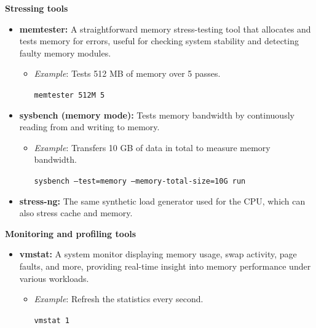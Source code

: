 \begin{exampleblock}

\textbf{Stressing tools}

\begin{itemize}
    \item \textbf{memtester:} A straightforward memory stress-testing tool that allocates and tests memory for errors, useful for checking system stability and detecting faulty memory modules.
    \begin{itemize}
        \item \textit{Example}: Tests 512 MB of memory over 5 passes.

        \begin{center}
        \tt{memtester 512M 5}
        \end{center}
    \end{itemize}

    \item \textbf{sysbench (memory mode):} Tests memory bandwidth by continuously reading from and writing to memory.
    \begin{itemize}
        \item \textit{Example}: Transfers 10 GB of data in total to measure memory bandwidth.

        \begin{center}
        \tt{sysbench --test=memory --memory-total-size=10G run}
        \end{center}
    \end{itemize}

    \item \textbf{stress-ng:} The same synthetic load generator used for the CPU, which can also stress cache and memory.
\end{itemize}

\medskip

\textbf{Monitoring and profiling tools}

\begin{itemize}
    \item \textbf{vmstat:} A system monitor displaying memory usage, swap activity, page faults, and more, providing real-time insight into memory performance under various workloads.
    \begin{itemize}
        \item \textit{Example}: Refresh the statistics every second.

        \begin{center}
        \tt{vmstat 1}
        \end{center}
    \end{itemize}


\end{itemize}
\end{exampleblock}
